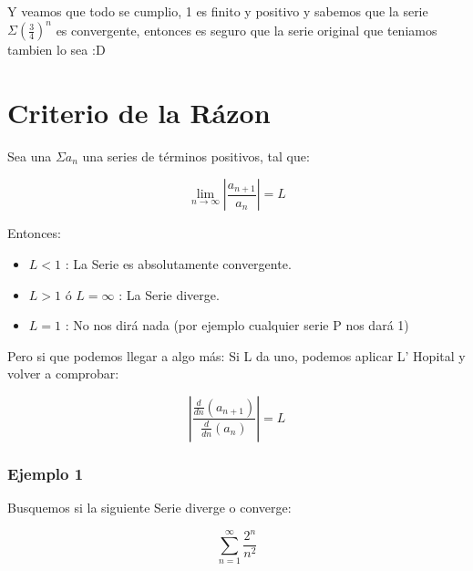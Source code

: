 \documentclass[12pt]{report}                                %
\begin{document}
            Y veamos que todo se cumplio, 1 es finito y positivo y sabemos que la serie $\Sigma (\frac{3}{4})^n$ es convergente, entonces es seguro que la serie original que teniamos tambien lo sea :D


    \clearpage
    \section{Criterio de la Rázon}

        Sea una $\Sigma a_n$ una series de términos positivos, tal que:

        \begin{equation}
            \lim_{n \to \infty} \left| \frac{a_{n+1}}{a_n} \right| = L
        \end{equation}

        Entonces:
        \begin{itemize}
            \item $L < 1$ : La Serie es absolutamente convergente.
            \item $L > 1$ ó $L = \infty$ : La Serie diverge.
            \item $L = 1$ : No nos dirá nada (por ejemplo cualquier serie P nos dará 1)
        \end{itemize}

        Pero si que podemos llegar a algo más:
        Si L da uno, podemos aplicar L' Hopital y volver a comprobar:

        \begin{equation}
        \left| \frac{\frac{d}{dn} (a_{n+1})}{\frac{d}{dn} (a_n)} \right| = L
        \end{equation}



        \subsubsection{Ejemplo 1}
            Busquemos si la siguiente Serie diverge o converge:

            \begin{equation*}
                \sum_{n=1}^{\infty} \frac{2^n}{n^2}
            \end{equation*}
\end{document}
